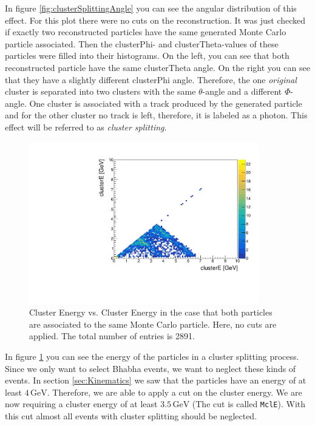 \documentclass[a4paper,11pt,twosided,final,german,openbib,pdftex,listof=totoc,bibliography=totoc]{scrbook}
\begin{document}
In figure \ref{fig:clusterSplittingAngle} you can see the angular distribution of this effect. For this plot there were no cuts on the reconstruction. It was just checked if exactly two reconstructed particles have the same generated Monte Carlo particle associated. Then the clusterPhi- and clusterTheta-values of these particles were filled into their histograms. On the left, you can see that both reconstructed particle have the same clusterTheta angle. On the right you can see that they have a slightly different clusterPhi angle. Therefore, the one \textit{original} cluster  is separated into two clusters with the same $\theta$-angle and a different $\Phi$-angle. One cluster is associated with a track produced by the generated particle and for the other cluster no track is left, therefore, it is labeled as a photon. This effect will be referred to as \textit{cluster splitting}.





\begin{figure}[h!]
	\centering
	\includegraphics[width=10cm]{AnhangPlots/EEdoubleMCE}
	\caption[Cluster Splitting Energy Distribution]{Cluster Energy vs. Cluster Energy in the case that both particles are associated to the same Monte Carlo particle. Here, no cuts are applied. The total number of entries is 2891.}
	\label{fig:clusterSplittingE}
\end{figure}

In figure \ref{fig:clusterSplittingE} you can see the energy of the particles in a cluster splitting process. Since we only want to select Bhabha events, we want to neglect these kinds of events. In section \ref{sec:Kinematics} we saw that the particles have an energy of at least $4\,\textrm{GeV}$. Therefore, we are able to apply a cut on the cluster energy. We are now requiring a cluster energy of at least $3.5\,\textrm{GeV}$ (The cut is called \texttt{MclE}). With this cut almost all events with cluster splitting should be neglected.
\end{document}
